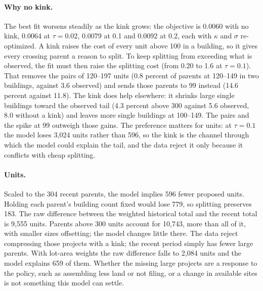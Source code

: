 \paragraph{Why no kink.} The best fit worsens steadily as the kink grows: the
objective is 0.0060 with no kink, 0.0064 at $\tau=0.02$, 0.0079 at 0.1 and
0.0092 at 0.2, each with $\kappa$ and $\sigma$ re-optimized. A kink raises the
cost of every unit above 100 in a building, so it gives every crossing parent
a reason to split. To keep splitting from exceeding what is observed, the fit
must then raise the splitting cost (from 0.20 to 1.6 at $\tau=0.1$). That
removes the pairs of 120--197 units (0.8 percent of parents at 120--149 in two
buildings, against 3.6 observed) and sends those parents to 99 instead (14.6
percent against 11.8). The kink does help elsewhere: it shrinks large single
buildings toward the observed tail (4.3 percent above 300 against 5.6
observed, 8.0 without a kink) and leaves more single buildings at 100--149.
The pairs and the spike at 99 outweigh those gains. The preference matters for
units: at $\tau=0.1$ the model loses 3,024 units rather than 596, so the kink
is the channel through which the model could explain the tail, and the data
reject it only because it conflicts with cheap splitting.

\paragraph{Units.} Scaled to the 304 recent parents, the model implies 596
fewer proposed units. Holding each parent's building count fixed would lose
779, so splitting preserves 183. The raw difference between the weighted
historical total and the recent total is 9,555 units. Parents above 300 units
account for 10,743, more than all of it, with smaller sizes offsetting; the
model changes little there. The data reject compressing those
projects with a kink; the recent period simply has fewer large parents. With
lot-area weights the raw difference falls to 2,084 units and the model
explains 659 of them. Whether the missing large projects are a response to the
policy, such as assembling less land or not filing, or a change in available
sites is not something this model can settle.

